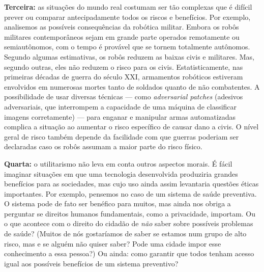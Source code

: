 \documentclass[
  11pt,
]{article}
\begin{document}
\textbf{Terceira:} as situações do mundo real costumam ser tão complexas
que é difícil prever ou comparar antecipadamente todos os riscos e
benefícios. Por exemplo, analisemos as possíveis consequências da
robótica militar. Embora os robôs militares contemporâneos sejam em
grande parte operados remotamente ou semiautônomos, com o tempo é
provável que se tornem totalmente autônomos. Segundo algumas
estimativas, os robôs reduzem as baixas civis e militares. Mas, segundo
outras, eles não reduzem o risco para os civis. Estatisticamente, nas
primeiras décadas de guerra do século XXI, armamentos robóticos
estiveram envolvidos em numerosas mortes tanto de soldados quanto de não
combatentes. A possibilidade de usar diversas técnicas --- como
\emph{adversarial patches} (adesivos adversariais, que interrompem a
capacidade de uma máquina de classificar imagens corretamente) --- para
enganar e manipular armas automatizadas complica a situação ao aumentar
o risco específico de causar dano a civis. O nível geral de risco também
depende da facilidade com que guerras poderiam ser declaradas caso os
robôs assumam a maior parte do risco físico.

\textbf{Quarta:} o utilitarismo não leva em conta outros aspectos
morais. É fácil imaginar situações em que uma tecnologia desenvolvida
produziria grandes benefícios para as sociedades, mas cujo uso ainda
assim levantaria questões éticas importantes. Por exemplo, pensemos no
caso de um sistema de saúde preventiva. O sistema pode de fato ser
benéfico para muitos, mas ainda nos obriga a perguntar se direitos
humanos fundamentais, como a privacidade, importam. Ou o que acontece
com o direito do cidadão de \emph{não} saber sobre possíveis problemas
de saúde? (Muitos de nós gostaríamos de saber se estamos num grupo de
alto risco, mas e se alguém não quiser saber? Pode uma cidade impor esse
conhecimento a essa pessoa?) Ou ainda: como garantir que todos tenham
acesso igual aos possíveis benefícios de um sistema preventivo?
\end{document}
